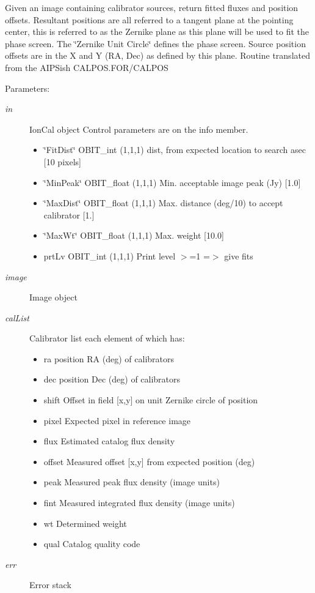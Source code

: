 Given an image containing calibrator sources, return fitted fluxes and position offsets. Resultant positions are all referred to a tangent plane at the pointing center, this is referred to as the Zernike plane as this plane will be used to fit the phase screen. The \char`\"{}Zernike Unit Circle\char`\"{} defines the phase screen. Source position offsets are in the X and Y (RA, Dec) as defined by this plane. Routine translated from the AIPSish CALPOS.FOR/CALPOS \begin{Desc}
\item[Parameters:]
\begin{description}
\item[{\em in}]Ion\-Cal object Control parameters are on the info member. \begin{itemize}
\item \char`\"{}Fit\-Dist\char`\"{} OBIT\_\-int (1,1,1) dist, from expected location to search asec [10 pixels] \item \char`\"{}Min\-Peak\char`\"{} OBIT\_\-float (1,1,1) Min. acceptable image peak (Jy) [1.0] \item \char`\"{}Max\-Dist\char`\"{} OBIT\_\-float (1,1,1) Max. distance (deg/10) to accept calibrator [1.] \item \char`\"{}Max\-Wt\char`\"{} OBIT\_\-float (1,1,1) Max. weight [10.0] \item prt\-Lv OBIT\_\-int (1,1,1) Print level $>$=1 =$>$ give fits \end{itemize}
\item[{\em image}]Image object \item[{\em cal\-List}]Calibrator list each element of which has: \begin{itemize}
\item ra position RA (deg) of calibrators \item dec position Dec (deg) of calibrators \item shift Offset in field [x,y] on unit Zernike circle of position \item pixel Expected pixel in reference image \item flux Estimated catalog flux density \item offset Measured offset [x,y] from expected position (deg) \item peak Measured peak flux density (image units) \item fint Measured integrated flux density (image units) \item wt Determined weight \item qual Catalog quality code \end{itemize}
\item[{\em err}]Error stack \end{description}
\end{Desc}
